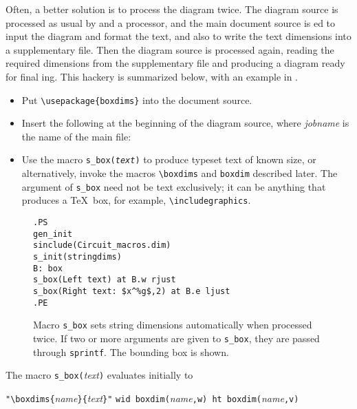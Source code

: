 Often, a better solution is to process the diagram twice.  The
diagram source is processed as usual by \Mfour and a \pic processor, and the
main document source is \latex{}ed to input the diagram and format the
text, and also to write the text dimensions into a supplementary file.
Then the diagram source is processed again, reading the required
dimensions from the supplementary file and producing a diagram ready
for final \latex{}ing.
This hackery is summarized below, with an example in .
\begin{itemize}
\item Put \verb|\usepackage{boxdims}| into the document source.
\item Insert the following at the beginning of the diagram source,
 where {\sl jobname} is the name of the main \latex file:\hfill\break
\item Use the macro {\tt s\_box({\sl text})} to produce
 typeset text of known size, or alternatively, invoke the macros
 \verb|\boxdims| and \verb|boxdim| described later.
 The argument of {\tt s\_box} need not be text exclusively; it can
 be anything that produces a \TeX\ box, for example, \verb|\includegraphics|.
\end{itemize}
\begin{figure}[h!t]
   \parbox{3.5in}{\small\tt.PS\\
     gen\_init\\
     sinclude(Circuit\_macros.dim)\\
     s\_init(stringdims)\\
     B: box\\
       \hbox{}\quad s\_box(Left text) at B.w rjust\\
       \hbox{}\quad s\_box(Right text: \$x\^{}{\%g}\$,2) at B.e ljust\\
     .PE}%
   \hfill\llap{\raise-0.25in\hbox{ }}%
   \caption{Macro {\tt s\_box} sets string dimensions automatically
    when processed twice.  If two or more arguments are
    given to {\tt s\_box}, they
    are passed through {\tt sprintf}.  The bounding box is shown.}
   \label{stringdim}
   \end{figure}

\noindent The macro \verb|s_box(|{\sl text}\verb|)| evaluates initially to

 \verb|"\boxdims{|{\sl name}\verb|}{|{\sl text}\verb|}"|
  \verb|wid boxdim(|{\sl name}\verb|,w) ht boxdim(|{\sl name}\verb|,v)|

